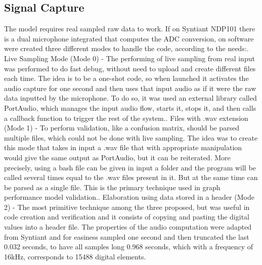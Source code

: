\subsection{Signal Capture}
\label{subsec:signal}
The model requires real sampled raw data to work. If on Syntiant NDP101 there is a dual microphone integrated that computes the ADC conversion, on software were created three different modes to handle the code, according to the needs:\newline{}. Live Sampling Mode (Mode 0) - The performing of live sampling from real input was performed to do fast debug, without need to upload and create different files each time. The idea is to be a one-shot code, so when launched it activates the audio capture for one second and then uses that input audio as if it were the raw data inputted by the microphone. To do so, it was used an external library called PortAudio\cite{portaudio}, which manages the input audio flow, starts it, stops it, and then calls a callback function to trigger the rest of the system.. Files with .wav extension (Mode 1) - To perform validation, like a confusion matrix, should be parsed multiple files, which could not be done with live sampling. The idea was to create this mode that takes in input a .wav file that with appropriate manipulation would give the same output as PortAudio, but it can be reiterated. More precisely, using a bash file can be given in input a folder and the program will be called several times equal to the .wav files present in it. But at the same time can be parsed as a single file. This is the primary technique used in graph performance model validation.. Elaboration using data stored in a header (Mode 2) - The most primitive technique among the three proposed, but was useful in code creation and verification and it consists of copying and pasting the digital values into a header file.\newline\newline
The properties of the audio computation were adapted from Syntiant and for easiness sampled one second and then truncated the last 0.032 seconds, to have all samples long 0.968 seconds, which with a frequency of 16kHz, corresponds to 15488 digital elements.
